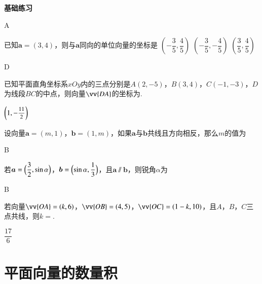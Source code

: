 \begin{Theorem}[平面向量基本定理]
\begin{exercise}{{\textbf{基础练习}}}
\begin{answer}
        A
      \end{answer}
    \item%
      已知$\bm a=(3,4)$，则与$\bm a$同向的单位向量的坐标是\xz
       {$(-\dfrac{3}5,\dfrac{4}5)$}
       {$(-\dfrac{3}5,-\dfrac{4}5)$}
       {$(\dfrac{3}5,\dfrac{4}5)$}
      \begin{answer}
        D
      \end{answer}
    \item%
      已知平面直角坐标系$xOy$内的三点分别是$A(2,-5)$，$B(3,4)$，$C(-1,-3)$，$D$为线段$BC$的中点，则向量$\vv{DA}$的坐标为\tk.
      \begin{answer}
        $\bigg(1,-\mfrac{11}2\biggr)$
      \end{answer}
    \item%
      设向量$\bm a=(m,1)$，$\bm b=(1,m)$，如果$\bm a$与$\bm b$共线且方向相反，那么$m$的值为\xz
      \begin{answer}
        B
      \end{answer}
    \item%
      若$\bm a=\Bigl(\dfrac{3}2,\sin\alpha\Bigr)$，$\bm b=\Bigl(\sin\alpha,\dfrac{1}3\Bigr)$，且$\bm a\varparallel \bm b$，则锐角$\alpha$为\xz
      \xx{30\degree}{45\degree}{60\degree}{75\degree}
      \begin{answer}
        B
      \end{answer}
    \item%
      若向量$\vv{OA}=(k,6)$，$\vv{OB}=(4,5)$，$\vv{OC}=(1-k,10)$，且$A$，$B$，$C$三点共线，则$k=$\tk.
      \begin{answer}
        $\dfrac{17}6$
      \end{answer}
  \end{exercise}
\vspace{2.5cm}
\section{平面向量的数量积}

\end{Theorem}
